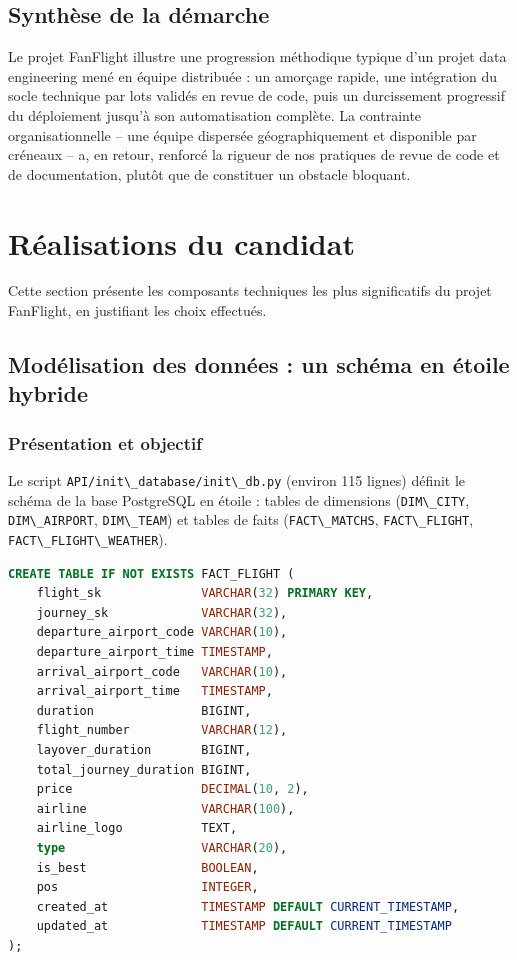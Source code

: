 \documentclass[11pt,a4paper]{report}
\newcommand{\code}[1]{\lstinline{#1}}
\begin{document}
\section{Synthèse de la démarche}

Le projet FanFlight illustre une progression méthodique typique d'un projet data engineering mené en équipe distribuée : un amorçage rapide, une intégration du socle technique par lots validés en revue de code, puis un durcissement progressif du déploiement jusqu'à son automatisation complète. La contrainte organisationnelle -- une équipe dispersée géographiquement et disponible par créneaux -- a, en retour, renforcé la rigueur de nos pratiques de revue de code et de documentation, plutôt que de constituer un obstacle bloquant.

\chapter{Réalisations du candidat}
\label{chap:realisations}

Cette section présente les composants techniques les plus significatifs du projet FanFlight, en justifiant les choix effectués.

\section{Modélisation des données : un schéma en étoile hybride}

\subsection{Présentation et objectif}

Le script \code{API/init\_database/init\_db.py} (environ 115 lignes) définit le schéma de la base PostgreSQL en étoile : tables de dimensions (\code{DIM\_CITY}, \code{DIM\_AIRPORT}, \code{DIM\_TEAM}) et tables de faits (\code{FACT\_MATCHS}, \code{FACT\_FLIGHT}, \code{FACT\_FLIGHT\_WEATHER}).

\begin{lstlisting}[language=SQL, caption={Extrait du schéma -- table de faits FACT\_FLIGHT}]
CREATE TABLE IF NOT EXISTS FACT_FLIGHT (
    flight_sk              VARCHAR(32) PRIMARY KEY,
    journey_sk             VARCHAR(32),
    departure_airport_code VARCHAR(10),
    departure_airport_time TIMESTAMP,
    arrival_airport_code   VARCHAR(10),
    arrival_airport_time   TIMESTAMP,
    duration               BIGINT,
    flight_number          VARCHAR(12),
    layover_duration       BIGINT,
    total_journey_duration BIGINT,
    price                  DECIMAL(10, 2),
    airline                VARCHAR(100),
    airline_logo           TEXT,
    type                   VARCHAR(20),
    is_best                BOOLEAN,
    pos                    INTEGER,
    created_at             TIMESTAMP DEFAULT CURRENT_TIMESTAMP,
    updated_at             TIMESTAMP DEFAULT CURRENT_TIMESTAMP
);
\end{lstlisting}
\end{document}
